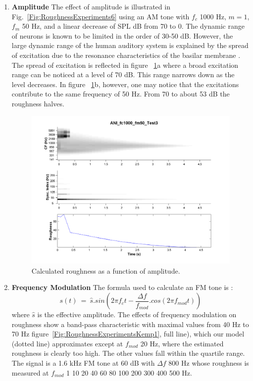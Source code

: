 \begin{enumerate}
\item {\textbf{Amplitude}}
    The effect of amplitude is illustrated in Fig.~\ref{Fig:RoughnessExperiments6}
    using an AM tone with $f_c$ 1000 Hz, $m = 1$, $f_m$ 50 Hz, and a
    linear decrease of SPL dB from 70 to 0. The dynamic range of
    neurons is known to be limited in the order of 30-50 dB. However,
    the large dynamic range of the human auditory system is explained
    by the spread of excitation due to the resonance characteristics
    of the basilar membrane \cite{Smith:88}. The spread of excitation
    is reflected in figure ~\ref{Fig:RoughnessExperiments26}a where a broad excitation
    range can be noticed at a level of 70 dB. This range narrows down
    as the level decreases. In figure ~\ref{Fig:RoughnessExperiments26}b, however, one
    may notice that the excitations contribute to the same frequency
    of 50 Hz. From 70 to about 53 dB the roughness halves.
    \begin{figure}[h]
        \centering
        \includegraphics[width=\IPEMDefaultFigureWidth]{Graphics/RoughnessExperiments26}
        \caption{Calculated roughness as a function of amplitude.}
        \label{Fig:RoughnessExperiments26}
    \end{figure}

\item {\textbf{Frequency Modulation}}
    The formula used to calculate an FM tone is
    \cite{DanielWeber:1997}:
    \begin{displaymath}
        s(t) ~=~ \hat{s}.
        sin \left( 2 \pi f_c t - \frac{\Delta f}{f_{mod}}. cos (2 \pi f_{mod} t) \right)
    \end{displaymath}
    where $\hat{s}$ is the effective amplitude. The effects of
    frequency modulation on roughness show a band-pass characteristic
    with maximal values from 40 Hz to 70 Hz \cite{Kemp:1982}
    figure~\ref{Fig:RoughnessExperimentsKemp1}, full line), which our model (dotted line)
    approximates except at $f_{mod}$ 20 Hz, where the estimated
    roughness is clearly too high. The other values fall within the
    quartile range. The signal is
    a 1.6 kHz FM tone at 60 dB with $\Delta f$ 800 Hz whose  roughness
    is measured at $f_{mod}$ 1 10 20 40 60 80 100 200 300 400 500
    Hz.


\end{enumerate}
